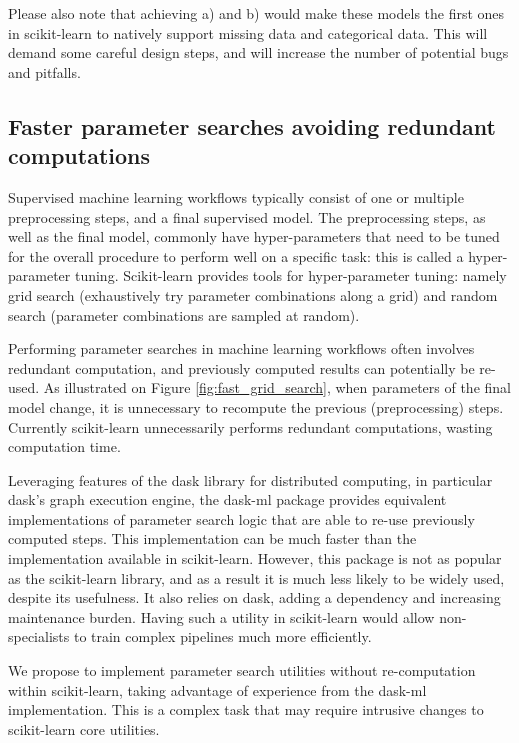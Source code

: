 \documentclass[11pt]{article}  %
\begin{document}
Please also note that achieving a) and b) would make these models the
first ones in scikit-learn to natively support missing data and
categorical data. This will demand some careful design steps, and will increase the number of potential bugs and pitfalls.


\subsection{Faster parameter searches avoiding redundant computations}

Supervised machine learning workflows typically consist of one or multiple
preprocessing steps, and a final supervised model. The preprocessing steps, as well as the final model, commonly have hyper-parameters that need to be tuned
for the overall procedure to perform well on a specific task: this is called a
hyper-parameter tuning. Scikit-learn provides tools for hyper-parameter tuning: namely grid search (exhaustively try parameter combinations along a grid) and
random search (parameter combinations are sampled at random).

Performing parameter searches in machine learning workflows often involves
redundant computation, and previously computed results can potentially be
re-used. As illustrated on Figure \ref{fig:fast_grid_search}, when parameters of
the final model change, it is unnecessary to recompute the previous
(preprocessing) steps.
Currently scikit-learn unnecessarily performs redundant computations, wasting
computation time.

Leveraging features of the dask library for distributed computing, in particular dask’s graph execution engine, the
dask-ml package provides equivalent implementations of
parameter search logic that are able to re-use previously computed steps.
This implementation can be much faster than the implementation available in
scikit-learn. However, this package is not as popular as the scikit-learn
library, and as a result it is much less likely to be widely used, despite
its usefulness. It also relies on dask, adding a dependency and increasing
maintenance burden. Having such a utility in scikit-learn would allow
non-specialists to train complex pipelines much more efficiently.

We propose to implement parameter search utilities without re-computation
within scikit-learn, taking advantage of experience from the dask-ml
implementation. This is a complex task that may require intrusive changes to
scikit-learn core utilities.
\end{document}
